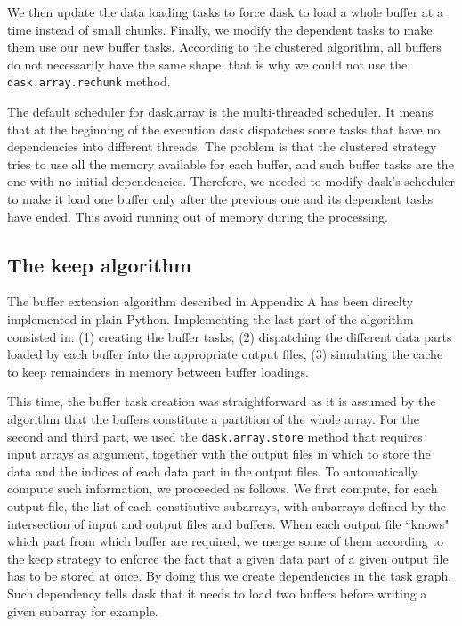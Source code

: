 \documentclass[conference]{IEEEtran}
\begin{document}
We then update the data loading tasks to force dask to load a whole buffer at
a time instead of small chunks. Finally, we modify the dependent tasks to make
them use our new buffer tasks. According to the clustered algorithm, all buffers
do not necessarily have the same shape, that is why we could not use the
\texttt{dask.array.rechunk} method.

The default scheduler for dask.array is the multi-threaded scheduler. It means
that at the beginning of the execution dask dispatches some tasks that have
no dependencies into different threads. The problem is that the clustered
strategy tries to use all the memory available for each buffer, and such buffer
tasks are the one with no initial dependencies. Therefore, we needed to
modify dask's scheduler to make it load one buffer only after the previous one
and its dependent tasks have ended. This avoid running out of memory during the
processing.

\subsection{The keep algorithm}

The buffer extension algorithm described in Appendix A has been direclty
implemented in plain Python. Implementing the last part of the algorithm
consisted in: (1) creating the buffer tasks, (2) dispatching the different data
parts loaded by each buffer into the appropriate output files, (3) simulating
the cache to keep remainders in memory between buffer loadings.

This time, the buffer task creation was straightforward as it is assumed by the
algorithm that the buffers constitute a partition of the whole array. For the
second and third part, we used the \texttt{dask.array.store} method that
requires input arrays as argument, together with the output files in which to
store the data and the indices of each data part in the output files. To
automatically compute such information, we proceeded as follows. We first
compute, for each output file, the list of each constitutive subarrays, with
subarrays defined by the intersection of input and output files and buffers.
When each output file ``knows" which part from which buffer are required, we
merge some of them according to the keep strategy to enforce the fact that
a given data part of a given output file has to be stored at once. By doing this
we create dependencies in the task graph. Such dependency tells dask that it
needs to load two buffers before writing a given subarray for example.
\end{document}
